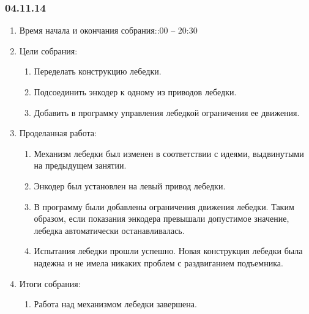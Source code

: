 
\subsubsection{04.11.14}

\begin{enumerate}
	\item Время начала и окончания собрания::00 – 20:30
	\item Цели собрания:\newline
	\begin{enumerate}
	  \item	Переделать конструкцию лебедки.\newline
	  
	  \item	Подсоединить энкодер к одному из приводов лебедки.\newline
	  
	  \item	Добавить в программу управления лебедкой ограничения ее движения.\newline
	  
    \end{enumerate}
    
	\item Проделанная работа:\newline
	\begin{enumerate}
	  \item	Механизм лебедки был изменен в соответствии с идеями, выдвинутыми на предыдущем занятии.\newline
      
      \item	Энкодер был установлен на левый привод лебедки.\newline
      
      \item	В программу были добавлены ограничения движения лебедки. Таким образом, если показания энкодера превышали допустимое значение, лебедка автоматически останавливалась.\newline
      
      \item	Испытания лебедки прошли успешно. Новая конструкция лебедки была надежна и не имела никаких проблем с раздвиганием подъемника.\newline
      
    \end{enumerate}
    
	\item Итоги собрания: \newline
	\begin{enumerate}
	  \item	Работа над механизмом лебедки завершена.\newline
	  

\end{enumerate}
\end{enumerate}
